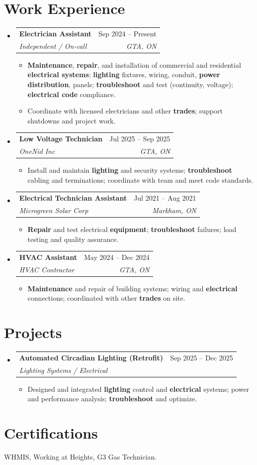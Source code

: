 \documentclass[letterpaper,11pt]{article}
\makeatletter
\newcommand{\resumeItem}[1]{\item\small{{#1 \vspace{-2pt}}}}
\newcommand{\resumeSubheading}[4]{
  \vspace{-4pt}\item
    \begin{tabular*}{0.97\textwidth}[t]{l@{\extracolsep{\fill}}r}
      \textbf{#1} & #2 \\
      \textit{\small #3} & \textit{\small #4} \\
    \end{tabular*}\vspace{-8pt}
}
\newcommand{\resumeSubHeadingListStart}{\begin{itemize}[leftmargin=0.15in, label={}]}
\newcommand{\resumeSubHeadingListEnd}{\end{itemize}}
\newcommand{\resumeItemListStart}{\begin{itemize}}
\newcommand{\resumeItemListEnd}{\end{itemize}\vspace{-5pt}}
\makeatother
\begin{document}
\section{Work Experience}
\resumeSubHeadingListStart

\resumeSubheading
  {Electrician Assistant}{Sep 2024 -- Present}
  {Independent / On-call}{GTA, ON}
\resumeItemListStart
  \resumeItem{\textbf{Maintenance}, \textbf{repair}, and installation of commercial and residential \textbf{electrical systems}; \textbf{lighting} fixtures, wiring, conduit, \textbf{power distribution}, panels; \textbf{troubleshoot} and test (continuity, voltage); \textbf{electrical code} compliance.}
  \resumeItem{Coordinate with licensed electricians and other \textbf{trades}; support shutdowns and project work.}
\resumeItemListEnd

\resumeSubheading
  {Low Voltage Technician}{Jul 2025 -- Sep 2025}
  {OneNid Inc}{GTA, ON}
\resumeItemListStart
  \resumeItem{Install and maintain \textbf{lighting} and security systems; \textbf{troubleshoot} cabling and terminations; coordinate with team and meet code standards.}
\resumeItemListEnd

\resumeSubheading
  {Electrical Technician Assistant}{Jul 2021 -- Aug 2021}
  {Microgreen Solar Corp}{Markham, ON}
\resumeItemListStart
  \resumeItem{\textbf{Repair} and test electrical \textbf{equipment}; \textbf{troubleshoot} failures; load testing and quality assurance.}
\resumeItemListEnd

\resumeSubheading
  {HVAC Assistant}{May 2024 -- Dec 2024}
  {HVAC Contractor}{GTA, ON}
\resumeItemListStart
  \resumeItem{\textbf{Maintenance} and repair of building systems; wiring and \textbf{electrical} connections; coordinated with other \textbf{trades} on site.}
\resumeItemListEnd

\resumeSubHeadingListEnd

\section{Projects}
\resumeSubHeadingListStart
\resumeSubheading
  {Automated Circadian Lighting (Retrofit)}{Sep 2025 -- Dec 2025}
  {Lighting Systems / Electrical}{ }
\resumeItemListStart
  \resumeItem{Designed and integrated \textbf{lighting} control and \textbf{electrical} systems; power and performance analysis; \textbf{troubleshoot} and optimize.}
\resumeItemListEnd
\resumeSubHeadingListEnd

\section{Certifications}
WHMIS, Working at Heights, G3 Gas Technician.
\end{document}
